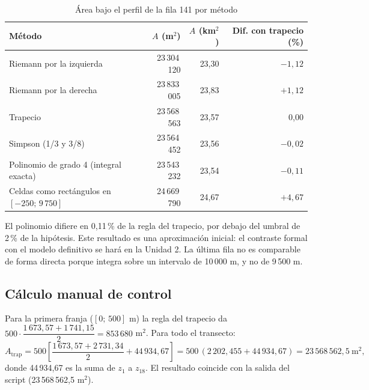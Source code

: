 \documentclass[11pt,a4paper]{article}
\begin{document}
\begin{table}[h]
\centering
\caption{Área bajo el perfil de la fila 141 por método}\label{tab:comp}
\small
\begin{tabular}{lrrr}
\toprule
Método & $A$ (m$^2$) & $A$ (km$^2$) & Dif. con trapecio (\%)\\
\midrule
Riemann por la izquierda & 23\,304\,120 & 23,30 & $-1{,}12$\\
Riemann por la derecha & 23\,833\,005 & 23,83 & $+1{,}12$\\
Trapecio & 23\,568\,563 & 23,57 & 0,00\\
Simpson (1/3 y 3/8) & 23\,564\,452 & 23,56 & $-0{,}02$\\
Polinomio de grado 4 (integral exacta) & 23\,543\,232 & 23,54 & $-0{,}11$\\
\midrule
Celdas como rectángulos en $[-250;\,9\,750]$ & 24\,669\,790 & 24,67 & $+4{,}67$\\
\bottomrule
\end{tabular}
\end{table}

El polinomio difiere en 0,11\,\% de la regla del trapecio, por debajo del umbral de 2\,\% de la hipótesis. Este resultado es una aproximación inicial: el contraste formal con el modelo definitivo se hará en la Unidad 2. La última fila no es comparable de forma directa porque integra sobre un intervalo de 10\,000 m, y no de 9\,500 m.

\subsection{Cálculo manual de control}
Para la primera franja ($[0;\,500]$ m) la regla del trapecio da $500 \cdot \dfrac{1\,673{,}57 + 1\,741{,}15}{2} = 853\,680$ m$^2$. Para todo el transecto:
\[
A_{\text{trap}} = 500\left[\frac{1\,673{,}57 + 2\,731{,}34}{2} + 44\,934{,}67\right] = 500\,(2\,202{,}455 + 44\,934{,}67) = 23\,568\,562{,}5\ \text{m}^2,
\]
donde 44\,934,67 es la suma de $z_1$ a $z_{18}$. El resultado coincide con la salida del script (23\,568\,562,5 m$^2$).


\end{document}
